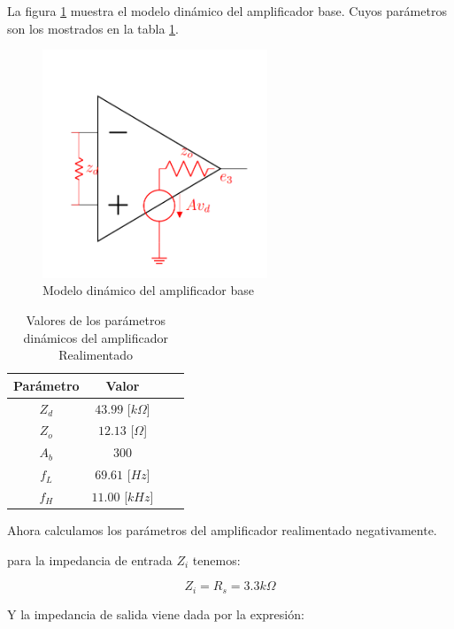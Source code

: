 
La figura \ref{fig:amplificador-base} muestra el modelo dinámico del amplificador base. Cuyos parámetros son los mostrados en la tabla \ref{tab:amplificador-base-dinamico}.

\begin{figure}[ht]
    \centering
    \includegraphics[width=0.6\textwidth]{src/images/p5/modelo-amplificador.png}
    \caption{Modelo dinámico del amplificador base}
    \label{fig:amplificador-base}
\end{figure}

\begin{table}[ht]
    \centering
    \begin{tabular}{|c|c|c|c|}
        \hline
        \textbf{Parámetro} & \textbf{Valor} \\ \hline
        $Z_d$ & $43.99$ [$k\Omega$] \\ \hline
        $Z_o$ & $12.13 $ [$\Omega$] \\ \hline
        $A_b$ & $300$ \\ \hline
        $f_L$ & $69.61$ [$Hz$] \\ \hline
        $f_H$ & $11.00$ [$kHz$] \\ \hline
    \end{tabular}
    \caption{Valores de los parámetros dinámicos del amplificador Realimentado}
    \label{tab:amplificador-base-dinamico}

\end{table}

Ahora calculamos los parámetros del amplificador realimentado negativamente.

para la impedancia de entrada $Z_i$ tenemos:

$$Z_i = R_s = 3.3 k\Omega$$

Y la impedancia de salida viene dada por la expresión:

